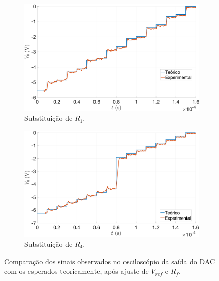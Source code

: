 \documentclass[a4paper, oneside]{article}
\begin{document}
\begin{figure}[ht]
	\centering
	\begin{subfigure}[b]{0.5\textwidth}
		\centering
		\includegraphics[width=\textwidth]{figures/cteAj_5_1_2_DAC_R1.png}
		\caption{Substituição de $R_1$.}
		\label{fig:cteAj_5_1_2_DAC_R1}
	\end{subfigure}%
	\hfill
	\begin{subfigure}[b]{0.5\textwidth}
		\centering
		\includegraphics[width=\textwidth]{figures/cteAj_5_1_2_DAC_R4.png}
		\caption{Substituição de $R_4$.}
		\label{fig:cteAj_5_1_2_DAC_R4}
	\end{subfigure}%
	\caption{Comparação dos sinais observados no osciloscópio da saída do DAC com os esperados teoricamente, após ajuste de $V_{ref}$ e $R_f$.}
	\label{fig:cteAj_5_1_2_DAC}
\end{figure}
\end{document}
